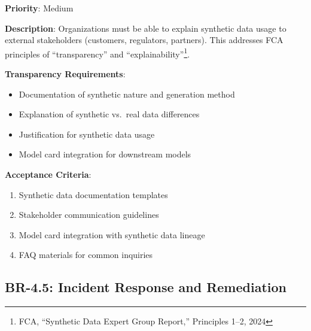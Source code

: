 \documentclass[12pt,a4paper,twoside]{report}
\begin{document}
\begin{tcolorbox}[colback=red!5,colframe=red!70,title=BR-4.4: External Transparency]
\textbf{Priority}: Medium

\textbf{Description}: Organizations must be able to explain synthetic data usage
to external stakeholders (customers, regulators, partners). This addresses FCA
principles of ``transparency'' and ``explainability''\footnote{FCA, ``Synthetic
Data Expert Group Report,'' Principles 1--2, 2024}.

\textbf{Transparency Requirements}:
\begin{itemize}
\item Documentation of synthetic nature and generation method
\item Explanation of synthetic vs.\ real data differences
\item Justification for synthetic data usage
\item Model card integration for downstream models
\end{itemize}

\textbf{Acceptance Criteria}:
\begin{enumerate}
\item Synthetic data documentation templates
\item Stakeholder communication guidelines
\item Model card integration with synthetic data lineage
\item FAQ materials for common inquiries
\end{enumerate}
\end{tcolorbox}

\subsection{BR-4.5: Incident Response and Remediation}
\end{document}
